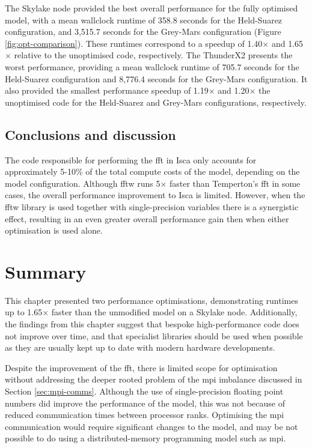 \documentclass[a4paper,11pt]{report}
\begin{document}
The Skylake node provided the best overall performance for the fully optimised model, with a mean wallclock runtime of 358.8 seconds for the Held-Suarez configuration, and 3,515.7 seconds for the Grey-Mars configuration  (Figure \ref{fig:opt-comparison}). These runtimes correspond to a speedup of 1.40$\times$ and 1.65$\times$ relative to the unoptimised code, respectively.  The ThunderX2 presents the worst performance, providing a mean wallclock runtime of 705.7 seconds for the Held-Suarez configuration and 8,776.4 seconds for the Grey-Mars configuration. It also provided the smallest performance speedup of 1.19$\times$ and 1.20$\times$ the unoptimised code for the Held-Suarez and Grey-Mars configurations, respectively. 
\par

\subsection{Conclusions and discussion}
The code responsible for performing the \gls{fft} in Isca only accounts for approximately 5-10\% of the total compute costs of the model, depending on the model configuration. Although \gls{fftw} runs 5$\times$ faster than Temperton's \gls{fft} in some cases, the overall performance improvement to Isca is limited. However, when the \gls{fftw} library is used together with single-precision variables there is a synergistic effect, resulting in an even greater overall performance gain then when either optimisation is used alone. 
\par



\section{Summary}
This chapter presented two performance optimisations, demonstrating runtimes up to 1.65$\times$ faster than the unmodified model on a Skylake node. Additionally, the findings from this chapter suggest that bespoke high-performance code does not improve over time, and that specialist libraries should be used when possible as they are usually kept up to date with modern hardware developments.
\par
Despite the improvement of the \gls{fft}, there is limited scope for optimisation without addressing the deeper rooted problem of the \gls{mpi} imbalance discussed in Section \ref{sec:mpi-comms}. Although the use of single-precision floating point numbers did improve the performance of the model, this was not because of reduced communication times between processor ranks. Optimising the \gls{mpi} communication would require significant changes to the model, and may be not possible to do using a distributed-memory programming model such as \gls{mpi}.
\end{document}
